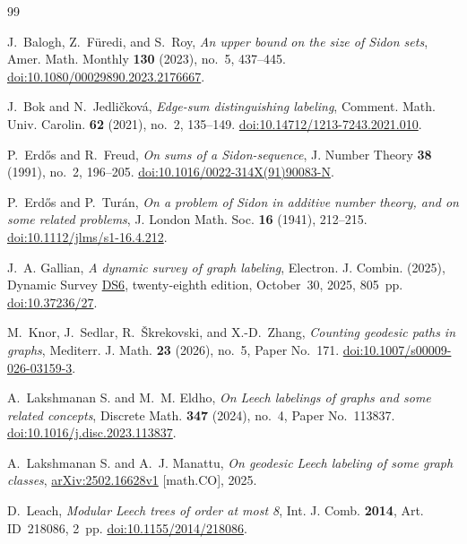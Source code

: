 \documentclass[11pt]{article}
\theoremstyle{definition}
\theoremstyle{remark}
\numberwithin{equation}{section}
\begin{document}
\begin{thebibliography}{99}

J.~Balogh, Z.~F\"uredi, and S.~Roy,
\emph{An upper bound on the size of Sidon sets},
Amer. Math. Monthly \textbf{130} (2023), no.~5, 437--445.
\href{https://doi.org/10.1080/00029890.2023.2176667}{doi:10.1080/00029890.2023.2176667}.

J.~Bok and N.~Jedli\v{c}kov\'a,
\emph{Edge-sum distinguishing labeling},
Comment. Math. Univ. Carolin. \textbf{62} (2021), no.~2, 135--149.
\href{https://doi.org/10.14712/1213-7243.2021.010}{doi:10.14712/1213-7243.2021.010}.

P.~Erd\H os and R.~Freud,
\emph{On sums of a Sidon-sequence},
J. Number Theory \textbf{38} (1991), no.~2, 196--205.
\href{https://doi.org/10.1016/0022-314X(91)90083-N}{doi:10.1016/0022-314X(91)90083-N}.

P.~Erd\H os and P.~Tur\'an,
\emph{On a problem of Sidon in additive number theory, and on some related problems},
J. London Math. Soc. \textbf{16} (1941), 212--215.
\href{https://doi.org/10.1112/jlms/s1-16.4.212}{doi:10.1112/jlms/s1-16.4.212}.

J.~A. Gallian,
\emph{A dynamic survey of graph labeling},
Electron. J. Combin. (2025), Dynamic Survey
\href{https://www.combinatorics.org/ojs/index.php/eljc/article/view/DS6}{DS6},
twenty-eighth edition, October~30, 2025, 805~pp.
\href{https://doi.org/10.37236/27}{doi:10.37236/27}.

M.~Knor, J.~Sedlar, R.~\v{S}krekovski, and X.-D.~Zhang,
\emph{Counting geodesic paths in graphs},
Mediterr. J. Math. \textbf{23} (2026), no.~5, Paper No.~171.
\href{https://doi.org/10.1007/s00009-026-03159-3}{doi:10.1007/s00009-026-03159-3}.

A.~Lakshmanan S. and M.~M. Eldho,
\emph{On Leech labelings of graphs and some related concepts},
Discrete Math. \textbf{347} (2024), no.~4, Paper No.~113837.
\href{https://doi.org/10.1016/j.disc.2023.113837}{doi:10.1016/j.disc.2023.113837}.

A.~Lakshmanan S. and A.~J. Manattu,
\emph{On geodesic Leech labeling of some graph classes},
\href{https://arxiv.org/abs/2502.16628v1}{arXiv:2502.16628v1} [math.CO], 2025.

D.~Leach,
\emph{Modular Leech trees of order at most 8},
Int. J. Comb. \textbf{2014}, Art. ID~218086, 2~pp.
\href{https://doi.org/10.1155/2014/218086}{doi:10.1155/2014/218086}.


\end{thebibliography}
\end{document}
